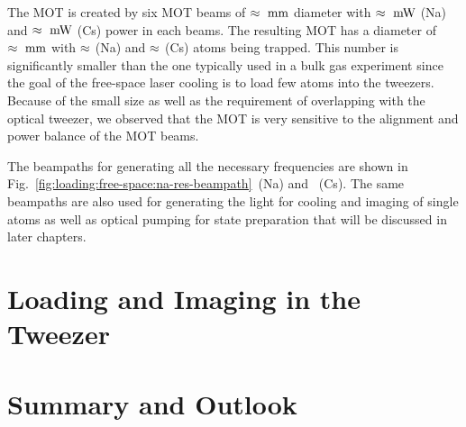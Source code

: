 The MOT is created by six MOT beams of $\approx\todo{number}~\mathrm{mm}$ diameter
with $\approx\todo{number}~\mathrm{mW}$ (Na) and $\approx\todo{number}~\mathrm{mW}$ (Cs)
power in each beams.
The resulting MOT has a diameter of $\approx\todo{number}~\mathrm{mm}$
with $\approx\todo{number}$ (Na) and $\approx\todo{number}$ (Cs) atoms being trapped.
This number is significantly smaller than the one typically used in a bulk gas experiment
since the goal of the free-space laser cooling is to load few atoms into the tweezers.
Because of the small size as well as the requirement of overlapping with the optical tweezer,
we observed that the MOT is very sensitive to the alignment and power balance of the MOT beams.


The beampaths for generating all the necessary frequencies are shown in
Fig.~\ref{fig:loading:free-space:na-res-beampath}~(Na) and \todo{}~(Cs).
The same beampaths are also used for generating the light for cooling
and imaging of single atoms as well as optical pumping for state preparation
that will be discussed in later chapters.

\section{Loading and Imaging in the Tweezer}
\label{ch:loading:loading}



\section{Summary and Outlook}
\label{ch:loading:summary}

\todo{}
